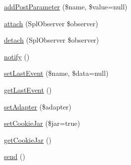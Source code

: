 \begin{DoxyCompactItemize}
\hyperlink{classHTTP__Request2_a45a950fb625fe85fedd123fc95cff92d}{add\+Post\+Parameter} (\$name, \$value=null)
\item 
\hyperlink{classHTTP__Request2_a91ff31f582d0156df454685e60b72e1c}{attach} (Spl\+Observer \$observer)
\item 
\hyperlink{classHTTP__Request2_a43da613f3526bfe033f5fafd58f9c50c}{detach} (Spl\+Observer \$observer)
\item 
\hyperlink{classHTTP__Request2_af35a8a6eb99219760dddd6223599a8ef}{notify} ()
\item 
\hyperlink{classHTTP__Request2_a1c05aea3c3857ad8f4c6a0a9eb33911d}{set\+Last\+Event} (\$name, \$data=null)
\item 
\hyperlink{classHTTP__Request2_afe70adf8c72a426f80ce66b4170e0f61}{get\+Last\+Event} ()
\item 
\hyperlink{classHTTP__Request2_a27fadfa673c3317675ab78b5df99264a}{set\+Adapter} (\$adapter)
\item 
\hyperlink{classHTTP__Request2_a396fdfdb92d2cb5dce1c8230919eb5d4}{set\+Cookie\+Jar} (\$jar=true)
\item 
\hyperlink{classHTTP__Request2_ad56d5f45235cb4f753d1ee9c7cd4c0e0}{get\+Cookie\+Jar} ()
\item 
\hyperlink{classHTTP__Request2_a0c8dee043682c61c0f1dc1558ea64d36}{send} ()
\end{DoxyCompactItemize}
